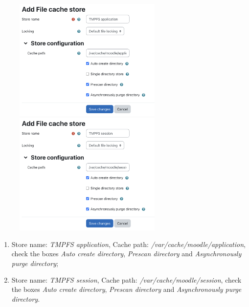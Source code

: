 \documentclass[12pt]{article}
\begin{document}
\begin{figure}[!ht]
\hspace{\fill}
\begin{minipage}[b]{0.45\linewidth} %
\centering
\includegraphics[width=7.3cm]{cache-application.png}
\end{minipage}
\hspace{\fill} %
\begin{minipage}[b]{0.45\linewidth}
\centering
\includegraphics[width=7.3cm]{cache-session.png}
\end{minipage}
\hspace{\fill}
\end{figure}

\begin{enumerate}
\item Store name: \emph{TMPFS application}, Cache path: \emph{/var/cache/moodle/application}, check the boxes \emph{Auto create directory}, \emph{Prescan directory} and \emph{Asynchronously purge directory};
\item Store name: \emph{TMPFS session}, Cache path: \emph{/var/cache/moodle/session}, check the boxes \emph{Auto create directory}, \emph{Prescan directory} and \emph{Asynchronously purge directory}.
\end{enumerate}
\end{document}
